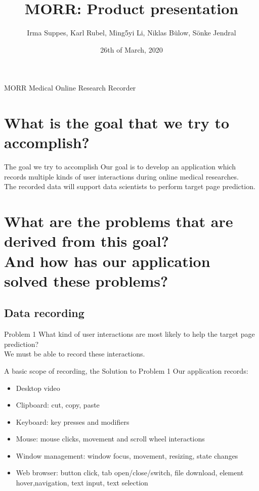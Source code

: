 \documentclass[aspectratio=169]{beamer}
\title{MORR: Product presentation}
\author{Irma Suppes, Karl Rubel, Ming5yi Li, Niklas Bülow, Sönke Jendral}
\date{26th of March, 2020}
\institute{KIT / Teco}
\begin{document}
  \maketitle
  
  \begin{frame}{MORR}
      Medical Online Research Recorder
  \end{frame}

  \section{What is the goal that we try to accomplish?}

  \begin{frame}{The goal we try to accomplish}
    Our goal is to develop an application which records multiple kinds of user interactions during online medical researches.\\
    The recorded data will support data scientists to perform target page prediction.
  \end{frame}

  \section{What are the problems that are derived from this goal? \\And how has our application solved these problems?}
  
   \subsection{Data recording}
   
   \begin{frame}{Problem 1}
       What kind of user interactions are most likely to help the target page prediction?\\
       We must be able to record these interactions.
   \end{frame}
   
   \begin{frame}{A basic scope of recording, the Solution to Problem 1}
    Our application records:
        \begin{itemize}
            \item  Desktop video
            \item Clipboard:  cut, copy, paste
            \item Keyboard:  key presses and modifiers
            \item  Mouse:  mouse clicks, movement and scroll wheel interactions
            \item Window management:  window focus, movement, resizing, state changes
            \item Web browser:  button click, tab open/close/switch, file download, element hover,navigation, text input, text selection
        \end{itemize}
   \end{frame}
   
\end{document}
